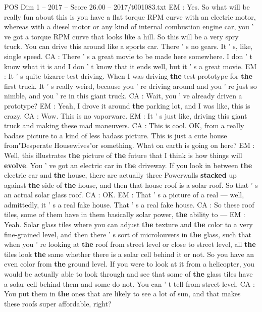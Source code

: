 \begin{textsample}{POS Dim 1 – 2017 – Score 26.00 – 2017/t001083.txt}
EM : Yes.
So what will be really fun about this is you have a flat torque RPM curve with an electric motor, whereas with a diesel motor or any kind of internal combustion engine car, you ' ve got a torque RPM curve that looks like a hill.
So this will be a very spry truck.
You can drive this around like a sports car.
There ' s no gears.
It ' s, like, single speed.
CA : There ' s a great movie to be made here somewhere.
I don ' t know what it is and I don ' t know that it ends well, but it ' s a great movie.
EM : It ' s quite bizarre test-driving.
When I was driving \textbf{the} test prototype for \textbf{the} first truck.
It ' s really weird, because you ' re driving around and you ' re just so nimble, and you ' re in this giant truck.
CA : Wait, you ' ve already driven a prototype?
EM : Yeah, I drove it around \textbf{the} parking lot, and I was like, this is crazy.
CA : Wow.
This is no vaporware.
EM : It ' s just like, driving this giant truck and making these mad maneuvers.
CA : This is cool.
OK, from a really badass picture to a kind of less badass picture.
This is just a cute house from"Desperate Housewives"or something.
What on earth is going on here?
EM : Well, this illustrates \textbf{the} picture of \textbf{the} future that I think is how things will \textbf{evolve}.
You ' ve got an electric car in \textbf{the} driveway.
If you look in between \textbf{the} electric car and \textbf{the} house, there are actually three Powerwalls \textbf{stacked} up against \textbf{the} side of \textbf{the} house, and then that house roof is a solar roof.
So that ' s an actual solar glass roof.
CA : OK.
EM : That ' s a picture of a real — well, admittedly, it ' s a real fake house.
That ' s a real fake house.
CA : So these roof tiles, some of them have in them basically solar power, \textbf{the} ability to — EM : Yeah.
Solar glass tiles where you can adjust \textbf{the} texture and \textbf{the} color to a very fine-grained level, and then there ' s sort of microlouvers in \textbf{the} glass, such that when you ' re looking at \textbf{the} roof from street level or close to street level, all \textbf{the} tiles look \textbf{the} same whether there is a solar cell behind it or not.
So you have an even color from \textbf{the} ground level.
If you were to look at it from a helicopter, you would be actually able to look through and see that some of \textbf{the} glass tiles have a solar cell behind them and some do not.
You can ' t tell from street level.
CA : You put them in \textbf{the} ones that are likely to see a lot of sun, and that makes these roofs super affordable, right?

\end{textsample}
